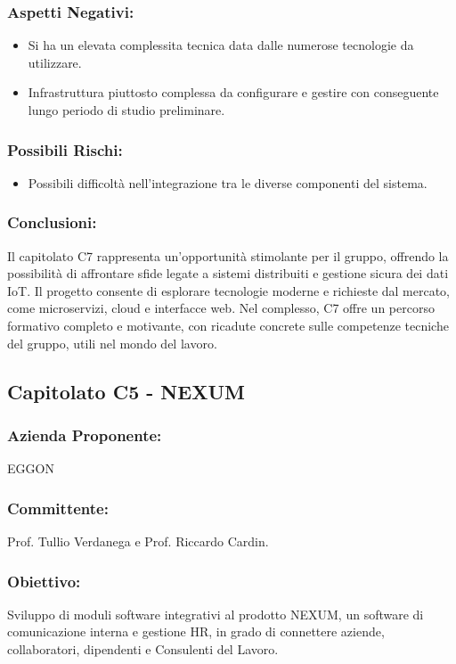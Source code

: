 \documentclass[a4paper,12pt]{article}
\begin{document}
\subsubsection*{Aspetti Negativi:}
\begin{itemize}
    \item Si ha un elevata complessita tecnica data dalle numerose tecnologie da utilizzare.
    \item Infrastruttura piuttosto complessa da configurare e gestire con conseguente lungo periodo di studio preliminare.
\end{itemize}

\subsubsection*{Possibili Rischi:}
\begin{itemize}
    \item Possibili difficoltà nell'integrazione tra le diverse componenti del sistema.
\end{itemize}

\subsubsection*{Conclusioni:}
Il capitolato C7 rappresenta un’opportunità stimolante per il gruppo, offrendo la possibilità di affrontare sfide legate a sistemi distribuiti e gestione sicura dei dati IoT.
Il progetto consente di esplorare tecnologie moderne e richieste dal mercato, come microservizi, cloud e interfacce web. Nel complesso, C7 offre un percorso formativo completo e motivante, con ricadute concrete sulle competenze tecniche del gruppo, utili nel mondo del lavoro.

\subsection{ Capitolato C5 - NEXUM}
\subsubsection*{Azienda Proponente:} EGGON
\subsubsection*{Committente:} Prof. Tullio Verdanega e Prof. Riccardo Cardin.
\subsubsection*{Obiettivo:}
Sviluppo di moduli software integrativi al prodotto NEXUM, un software di comunicazione interna e gestione HR, in grado di connettere aziende, collaboratori, dipendenti e Consulenti del Lavoro.
\end{document}
